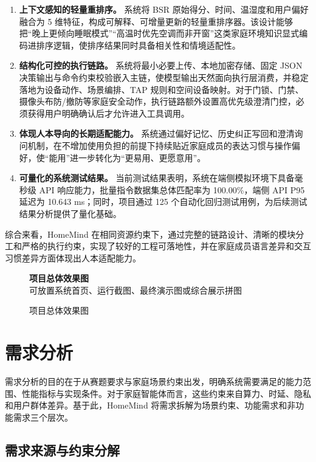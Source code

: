 \documentclass[12pt,a4paper,oneside]{ctexrep}
\newcommand{\figureplaceholder}[2]{
    \begin{figure}[H]
        \centering
        \begin{placeholderbox}[图占位符]
            \centering
            \vspace{2.6cm}
            {\Large \textbf{#1}}\\[0.6em]
            {\small #2}
            \vspace{2.6cm}
        \end{placeholderbox}
        \caption{#1}
    \end{figure}
}
\begin{document}
\begin{enumerate}
    \item \textbf{上下文感知的轻量重排序。} 系统将 BSR 原始得分、时间、温湿度和用户偏好融合为 5 维特征，构成可解释、可增量更新的轻量重排序器。该设计能够把“晚上更倾向睡眠模式”“高温时优先空调而非开窗”这类家庭环境知识显式编码进排序逻辑，使排序结果同时具备相关性和情境适配性。
    \item \textbf{结构化可控的执行链路。} 系统将最小必要上传、本地加密存储、固定 JSON 决策输出与命令约束校验嵌入主链，使模型输出天然面向执行层消费，并稳定落地为设备动作、场景编排、TAP 规则和空间设备映射。对于门锁、门禁、摄像头布防/撤防等家庭安全动作，执行链路额外设置高优先级澄清门控，必须获得用户明确确认后才允许进入工具调用。
    \item \textbf{体现人本导向的长期适配能力。} 系统通过偏好记忆、历史纠正写回和澄清询问机制，在不增加使用负担的前提下持续贴近家庭成员的表达习惯与操作偏好，使“能用”进一步转化为“更易用、更愿意用”。
    \item \textbf{可量化的系统测试结果。} 当前测试结果表明，系统在端侧模拟环境下具备毫秒级 API 响应能力，批量指令数据集总体匹配率为 100.00\%，端侧 API P95 延迟为 10.643 ms；同时，项目通过 125 个自动化回归测试用例，为后续测试结果分析提供了量化基础。
\end{enumerate}

综合来看，HomeMind 在相同资源约束下，通过完整的链路设计、清晰的模块分工和严格的执行约束，实现了较好的工程可落地性，并在家庭成员语言差异和交互习惯差异方面体现出人本适配能力。

\figureplaceholder{项目总体效果图}{可放置系统首页、运行截图、最终演示图或综合展示拼图}

\chapter{需求分析}

需求分析的目的在于从赛题要求与家庭场景约束出发，明确系统需要满足的能力范围、性能指标与实现条件。对于家庭智能体而言，这些约束来自算力、时延、隐私和用户群体差异。基于此，HomeMind 将需求拆解为场景约束、功能需求和非功能需求三个层次。

\section{需求来源与约束分解}
\end{document}
